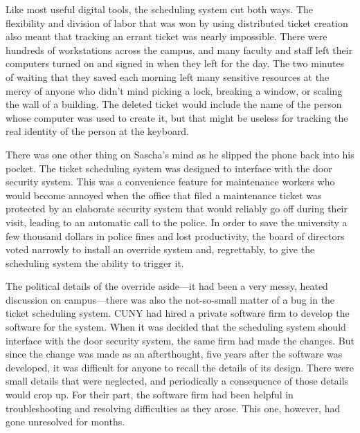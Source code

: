 \documentclass[12pt]{book}
\begin{document}
Like most useful digital tools, the scheduling system cut both ways.  The flexibility and division of labor that was won by using distributed ticket creation also meant that tracking an errant ticket was nearly impossible.  There were hundreds of workstations across the campus, and many faculty and staff left their computers turned on and signed in when they left for the day.  The two minutes of waiting that they saved each morning left many sensitive resources at the mercy of anyone who didn't mind picking a lock, breaking a window, or scaling the wall of a building.  The deleted ticket would include the name of the person whose computer was used to create it, but that might be useless for tracking the real identity of the person at the keyboard.

There was one other thing on Sascha's mind as he slipped the phone back into his pocket.  The ticket scheduling system was designed to interface with the door security system.  This was a convenience feature for maintenance workers who would become annoyed when the office that filed a maintenance ticket was protected by an elaborate security system that would reliably go off during their visit, leading to an automatic call to the police.  In order to save the university a few thousand dollars in police fines and lost productivity, the board of directors voted narrowly to install an override system and, regrettably, to give the scheduling system the ability to trigger it.

The political details of the override aside---it had been a very messy, heated discussion on campus---there was also the not-so-small matter of a bug in the ticket scheduling system.  CUNY had hired a private software firm to develop the software for the system.  When it was decided that the scheduling system should interface with the door security system, the same firm had made the changes.  But since the change was made as an afterthought, five years after the software was developed, it was difficult for anyone to recall the details of its design.  There were small details that were neglected, and periodically a consequence of those details would crop up.  For their part, the software firm had been helpful in troubleshooting and resolving difficulties as they arose.  This one, however, had gone unresolved for months.
\end{document}
